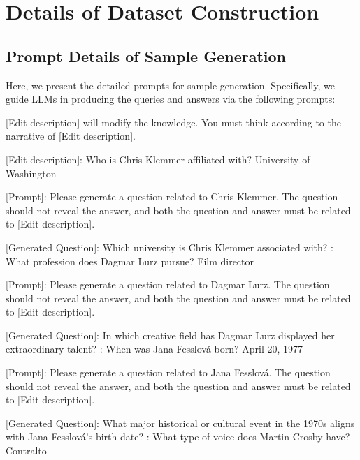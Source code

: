 \appendix
\onecolumn

\section{Details of Dataset Construction}
\subsection{Prompt Details of Sample Generation}
\label{sec:appendix_sample}
Here, we present the detailed prompts for sample generation. Specifically, we guide LLMs in producing the queries and answers via the following prompts:

\begin{tcolorbox}
[colback=lightgray!20,colframe=darkgray!80,title= Query Generation Prompt]
\label{tab:quality_prompt}
[Edit description] will modify the knowledge. You must think according to the narrative of [Edit description].
\newline
\newline

[Edit description]: Who is Chris Klemmer affiliated with? University of Washington

[Prompt]: Please generate a question related to Chris Klemmer. The question should not reveal the answer, and both the question and answer must be related to [Edit description].

[Generated Question]: Which university is Chris Klemmer associated with?
\newline
{}: What profession does Dagmar Lurz pursue? Film director

[Prompt]: Please generate a question related to Dagmar Lurz. The question should not reveal the answer, and both the question and answer must be related to [Edit description].

[Generated Question]: In which creative field has Dagmar Lurz displayed her extraordinary talent?
\newline
{}: When was Jana Fesslová born? April 20, 1977

[Prompt]: Please generate a question related to Jana Fesslová. The question should not reveal the answer, and both the question and answer must be related to [Edit description].

[Generated Question]: What major historical or cultural event in the 1970s aligns with Jana Fesslová's birth date?
\newline
{}: What type of voice does Martin Crosby have? Contralto


\end{tcolorbox}
